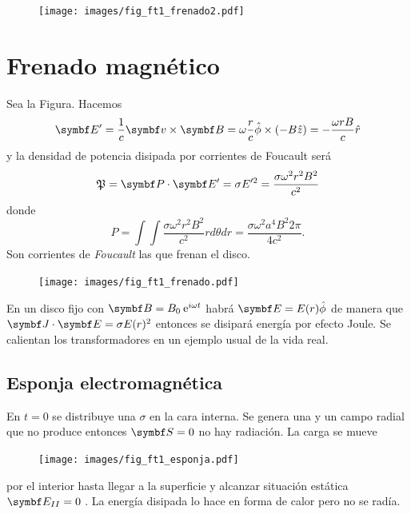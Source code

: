 \documentclass[10pt,oneside]{CBFT_book}
\begin{document}
\begin{figure}[htb]
	\begin{center}
	\texttt{[image: images/fig\_ft1\_frenado2.pdf]}	 
	\end{center}
	\caption{}
\end{figure} 

\section{Frenado magnético}

Sea la Figura. Hacemos
\[
	\vb{E}' = \frac{1}{c}\pv{v}{B} = \omega \frac{r}{c} \hat{\phi} \times (-B\hat{z}) = 
	-\frac{\omega r B}{c} \hat{r}
\]
y la densidad de potencia disipada por corrientes de Foucault será
\[
	\mathfrak{P} = \pe{P}{E'} = \sigma E'^2 = \frac{\sigma \omega^2 r^2 B^2}{c^2}
\]
donde 
\[
	P = \int \int \frac{\sigma \omega^2 r^2 B^2}{c^2} r d\theta dr =
		\frac{\sigma \omega^2 a^4 B^2 2\pi }{4 c^2}.
\]
Son corrientes de {\it Foucault} las que frenan el disco.

\begin{figure}[htb]
	\begin{center}
	\texttt{[image: images/fig\_ft1\_frenado.pdf]}	 
	\end{center}
	\caption{}
\end{figure} 

En un disco fijo con $\vb{B} = B_0 \euler^{i\omega t}$  habrá $\vb{E} = E(r) \hat{\phi}$ de manera que 
$\pe{J}{E} = \sigma E(r)^2$ entonces se disipará energía por efecto Joule. Se calientan los 
transformadores en un ejemplo usual de la vida real.


\subsection{Esponja electromagnética}

En $t=0$ se distribuye una $\sigma$ en la cara interna. Se genera una  y un campo  radial que 
no produce  entonces $\vb{S}=0$ no hay radiación.
La carga se mueve 

\begin{figure}[htb]
	\begin{center}
	\texttt{[image: images/fig\_ft1\_esponja.pdf]}	 
	\end{center}
	\caption{}
\end{figure} 

por el interior hasta llegar a la superficie y alcanzar situación estática $\vb{E}_{II} = 0$ .
La energía disipada lo hace en forma de calor pero no se radía.

\end{document}
